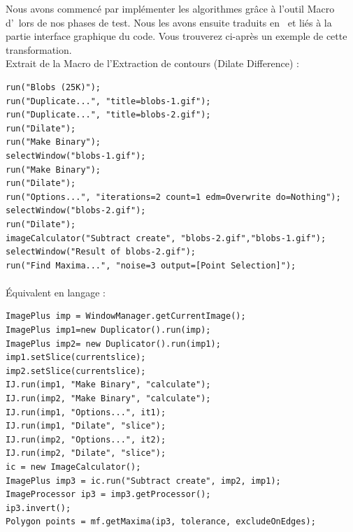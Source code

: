 Nous avons commencé par implémenter les algorithmes grâce à l'outil Macro d'\imj ~lors de nos  phases de test. Nous les avons ensuite traduits en \java ~et liés à la partie interface graphique du code. Vous trouverez ci-après un exemple de cette transformation. \\

Extrait de la Macro de l'Extraction de contours (Dilate Difference) :
\begin{center}
\begin{fmpage}{16cm}
\begin{small}
\begin{lstlisting}
run("Blobs (25K)");
run("Duplicate...", "title=blobs-1.gif");
run("Duplicate...", "title=blobs-2.gif");
run("Dilate");
run("Make Binary");
selectWindow("blobs-1.gif");
run("Make Binary");
run("Dilate");
run("Options...", "iterations=2 count=1 edm=Overwrite do=Nothing");
selectWindow("blobs-2.gif");
run("Dilate");
imageCalculator("Subtract create", "blobs-2.gif","blobs-1.gif");
selectWindow("Result of blobs-2.gif");
run("Find Maxima...", "noise=3 output=[Point Selection]");
\end{lstlisting}
\end{small}	
\end{fmpage}
\end{center}

\paragraph*{}
\pagebreak
Équivalent en langage \java :
\begin{center}
\begin{fmpage}{16cm}
\begin{small}
\begin{lstlisting}
ImagePlus imp = WindowManager.getCurrentImage();
ImagePlus imp1=new Duplicator().run(imp);
ImagePlus imp2= new Duplicator().run(imp1);
imp1.setSlice(currentslice);
imp2.setSlice(currentslice);
IJ.run(imp1, "Make Binary", "calculate");
IJ.run(imp2, "Make Binary", "calculate");
IJ.run(imp1, "Options...", it1);
IJ.run(imp1, "Dilate", "slice");
IJ.run(imp2, "Options...", it2);
IJ.run(imp2, "Dilate", "slice");
ic = new ImageCalculator();
ImagePlus imp3 = ic.run("Subtract create", imp2, imp1);
ImageProcessor ip3 = imp3.getProcessor();
ip3.invert();
Polygon points = mf.getMaxima(ip3, tolerance, excludeOnEdges);
\end{lstlisting}
\end{small}	
\end{fmpage}
\end{center}

